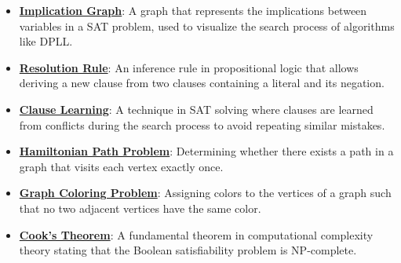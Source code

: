 \documentclass{article}%
\begin{document}
\begin{itemize}[leftmargin=*]
\item \href{https://www.math.purdue.edu/~yipn/351/15L2-SAT.pdf#page=24}{\textbf{Implication Graph}}: A graph that represents the implications between variables in a SAT problem, used to visualize the search process of algorithms like DPLL.%
\item \href{https://www.math.purdue.edu/~yipn/351/15L2-SAT.pdf#page=32}{\textbf{Resolution Rule}}: An inference rule in propositional logic that allows deriving a new clause from two clauses containing a literal and its negation.%
\item \href{https://www.math.purdue.edu/~yipn/351/15L2-SAT.pdf#page=35}{\textbf{Clause Learning}}: A technique in SAT solving where clauses are learned from conflicts during the search process to avoid repeating similar mistakes.%
\item \href{https://www.math.purdue.edu/~yipn/351/15L2-SAT.pdf#page=40}{\textbf{Hamiltonian Path Problem}}: Determining whether there exists a path in a graph that visits each vertex exactly once.%
\item \href{https://www.math.purdue.edu/~yipn/351/15L2-SAT.pdf#page=47}{\textbf{Graph Coloring Problem}}: Assigning colors to the vertices of a graph such that no two adjacent vertices have the same color.%
\item \href{https://www.math.purdue.edu/~yipn/351/15L2-SAT.pdf#page=54}{\textbf{Cook's Theorem}}: A fundamental theorem in computational complexity theory stating that the Boolean satisfiability problem is NP-complete.%
\end{itemize}%
\end{document}
